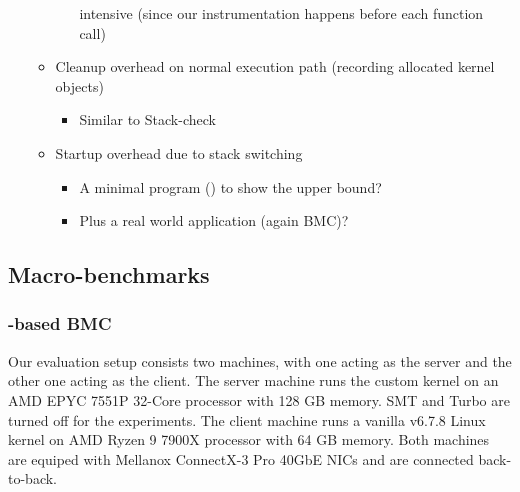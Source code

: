 \begin{itemize}
\begin{itemize}
\begin{itemize}
                        intensive (since our instrumentation happens before
                        each function call)
                \end{itemize}
            \item Cleanup overhead on normal execution path (recording
                allocated kernel objects)
                \begin{itemize}
                    \item Similar to Stack-check
                \end{itemize}
            \item Startup overhead due to stack switching
                \begin{itemize}
                    \item A minimal program () to show the upper bound?
                    \item Plus a real world application (again BMC)?
                \end{itemize}
        \end{itemize}
\end{itemize}

\subsection{Macro-benchmarks}
\subsubsection{\projname{}-based BMC}

 Our evaluation setup consists two machines, with one
    acting as the server and the other one acting as the client.
The server machine runs the \projname{} custom kernel on an AMD EPYC 7551P
    32-Core processor with 128 GB memory.
SMT and Turbo are turned off for the experiments.
The client machine runs a vanilla v6.7.8 Linux kernel on AMD Ryzen 9 7900X
    processor with 64 GB memory.
Both machines are equiped with Mellanox ConnectX-3 Pro 40GbE NICs and are
    connected back-to-back.